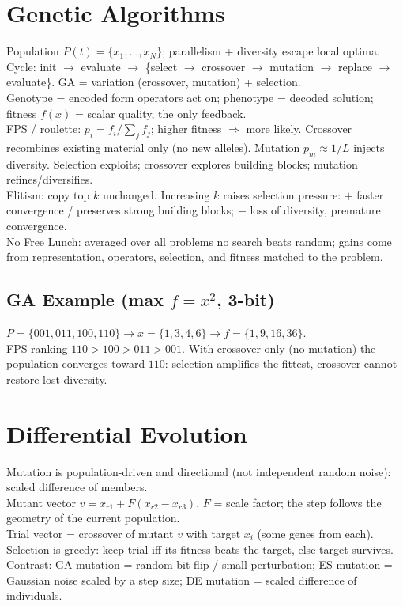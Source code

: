 \section{Genetic Algorithms}
Population \(P(t)=\{x_1,\dots,x_N\}\); parallelism + diversity escape local optima. Cycle: init \(\to\) evaluate \(\to\) \{select \(\to\) crossover \(\to\) mutation \(\to\) replace \(\to\) evaluate\}. GA = variation (crossover, mutation) + selection.\\
Genotype = encoded form operators act on; phenotype = decoded solution; fitness \(f(x)\) = scalar quality, the only feedback.\\
FPS / roulette: \(p_i=f_i/\sum_j f_j\); higher fitness \(\Rightarrow\) more likely. Crossover recombines existing material only (no new alleles). Mutation \(p_m\approx1/L\) injects diversity. Selection exploits; crossover explores building blocks; mutation refines/diversifies.\\
Elitism: copy top \(k\) unchanged. Increasing \(k\) raises selection pressure: \(+\) faster convergence / preserves strong building blocks; \(-\) loss of diversity, premature convergence.\\
No Free Lunch: averaged over all problems no search beats random; gains come from representation, operators, selection, and fitness matched to the problem.

\subsection*{GA Example (max \(f{=}x^2\), 3-bit)}
\(P=\{001,011,100,110\}\to x=\{1,3,4,6\}\to f=\{1,9,16,36\}\).\\
FPS ranking \(110>100>011>001\). With crossover only (no mutation) the population converges toward \(110\): selection amplifies the fittest, crossover cannot restore lost diversity.

\section{Differential Evolution}
Mutation is population-driven and directional (not independent random noise): scaled difference of members.\\
Mutant vector \(v=x_{r1}+F(x_{r2}-x_{r3})\), \(F\) = scale factor; the step follows the geometry of the current population.\\
Trial vector = crossover of mutant \(v\) with target \(x_i\) (some genes from each). Selection is greedy: keep trial iff its fitness beats the target, else target survives.\\
Contrast: GA mutation = random bit flip / small perturbation; ES mutation = Gaussian noise scaled by a step size; DE mutation = scaled difference of individuals.

